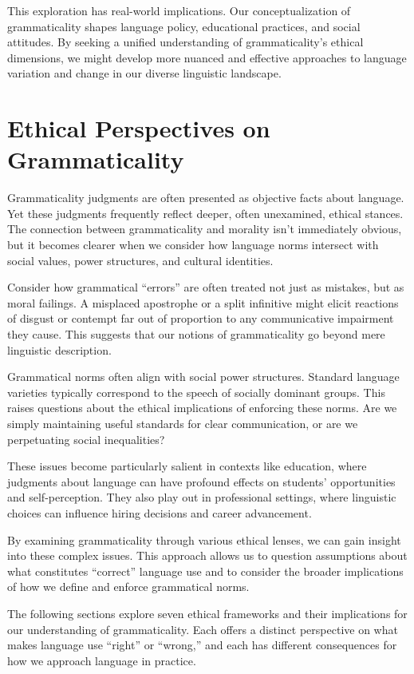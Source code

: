 This exploration has real-world implications. Our conceptualization of grammaticality shapes language policy, educational practices, and social attitudes. By seeking a unified understanding of grammaticality's ethical dimensions, we might develop more nuanced and effective approaches to language variation and change in our diverse linguistic landscape.

\section{Ethical Perspectives on Grammaticality}

Grammaticality judgments are often presented as objective facts about language. Yet these judgments frequently reflect deeper, often unexamined, ethical stances. The connection between grammaticality and morality isn't immediately obvious, but it becomes clearer when we consider how language norms intersect with social values, power structures, and cultural identities.

Consider how grammatical ``errors'' are often treated not just as mistakes, but as moral failings. A misplaced apostrophe or a split infinitive might elicit reactions of disgust or contempt far out of proportion to any communicative impairment they cause. This suggests that our notions of grammaticality go beyond mere linguistic description.

Grammatical norms often align with social power structures. Standard language varieties typically correspond to the speech of socially dominant groups. This raises questions about the ethical implications of enforcing these norms. Are we simply maintaining useful standards for clear communication, or are we perpetuating social inequalities?

These issues become particularly salient in contexts like education, where judgments about language can have profound effects on students' opportunities and self-perception. They also play out in professional settings, where linguistic choices can influence hiring decisions and career advancement.

By examining grammaticality through various ethical lenses, we can gain insight into these complex issues. This approach allows us to question assumptions about what constitutes ``correct'' language use and to consider the broader implications of how we define and enforce grammatical norms.

The following sections explore seven ethical frameworks and their implications for our understanding of grammaticality. Each offers a distinct perspective on what makes language use ``right'' or ``wrong,'' and each has different consequences for how we approach language in practice.


